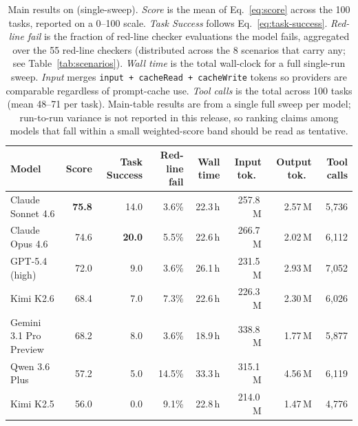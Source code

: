 
\begin{table}[t]
  \caption{Main results on \bench{} (single-sweep). \emph{Score} is the mean of Eq.~\eqref{eq:score} across the 100 tasks, reported on a 0--100 scale. \emph{Task Success} follows Eq.~\eqref{eq:task-success}. \emph{Red-line fail} is the fraction of red-line checker evaluations the model fails, aggregated over the 55 red-line checkers (distributed across the 8 scenarios that carry any; see Table~\ref{tab:scenarios}). \emph{Wall time} is the total wall-clock for a full single-run sweep. \emph{Input} merges \texttt{input + cacheRead + cacheWrite} tokens so providers are comparable regardless of prompt-cache use. \emph{Tool calls} is the total across 100 tasks (mean 48--71 per task). Main-table results are from a single full sweep per model; run-to-run variance is not reported in this release, so ranking claims among models that fall within a small weighted-score band should be read as tentative.}
  \label{tab:leaderboard}
  \centering
  \scriptsize
  \setlength{\tabcolsep}{5pt}
  \begin{tabular}{lrrrrrrr}
    \toprule
    Model                         & Score & Task Success & Red-line fail & Wall time & Input tok.\ & Output tok.\ & Tool calls \\
    \midrule
    Claude Sonnet 4.6             & \textbf{75.8} & 14.0          &  3.6\% & 22.3\,h & 257.8\,M & 2.57\,M & 5{,}736 \\
    Claude Opus 4.6               & 74.6          & \textbf{20.0} &  5.5\% & 22.6\,h & 266.7\,M & 2.02\,M & 6{,}112 \\
    GPT-5.4 (high)                & 72.0          & 9.0           &  3.6\% & 26.1\,h & 231.5\,M & 2.93\,M & 7{,}052 \\
    Kimi K2.6                     & 68.4          & 7.0           &  7.3\% & 22.6\,h & 226.3\,M & 2.30\,M & 6{,}026 \\
    Gemini 3.1 Pro Preview        & 68.2          & 8.0           &  3.6\% & 18.9\,h & 338.8\,M & 1.77\,M & 5{,}877 \\
    Qwen 3.6 Plus                 & 57.2          & 5.0           & 14.5\% & 33.3\,h & 315.1\,M & 4.56\,M & 6{,}119 \\
    Kimi K2.5                     & 56.0          & 0.0           &  9.1\% & 22.8\,h & 214.0\,M & 1.47\,M & 4{,}776 \\
    \bottomrule
  \end{tabular}
\end{table}
